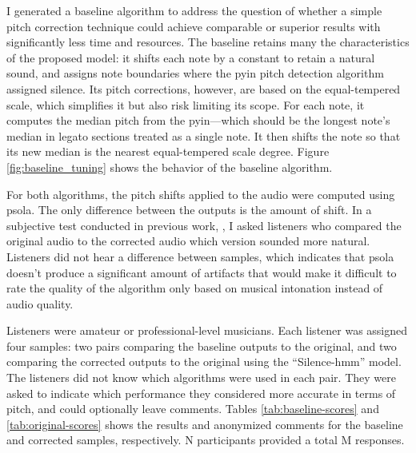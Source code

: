 I generated a baseline algorithm to address the question of whether a simple pitch correction technique could achieve comparable or superior results with significantly less time and resources. The baseline retains many the characteristics of the proposed model: it shifts each note by a constant to retain a natural sound, and assigns note boundaries where the \gls{pyin} pitch detection algorithm assigned silence. Its pitch corrections, however, are based on the equal-tempered scale, which simplifies it but also risk limiting its scope. For each note, it computes the median pitch from the \gls{pyin}---which should be the longest note's median in legato sections treated as a single note. It then shifts the note so that its new median is the nearest equal-tempered scale degree. Figure \ref{fig:baseline_tuning} shows the behavior of the baseline algorithm.

For both algorithms, the pitch shifts applied to the audio were computed using \gls{psola}. The only difference between the outputs is the amount of shift. In a subjective test conducted in previous work, \cite{wager2020deep}, I asked listeners who compared the original audio to the corrected audio which version sounded more natural. Listeners did not hear a difference between samples, which indicates that \gls{psola} doesn't produce a significant amount of artifacts that would make it difficult to rate the quality of the algorithm only based on musical intonation instead of audio quality.

Listeners were amateur or professional-level musicians. Each listener was assigned four samples: two pairs comparing the baseline outputs to the original, and two comparing the corrected outputs to the original using the ``Silence-\gls{hmm}'' model. The listeners did not know which algorithms were used in each pair. They were asked to indicate which performance they considered more accurate in terms of pitch, and could optionally leave comments. Tables \ref{tab:baseline-scores} and \ref{tab:original-scores} shows the results and anonymized comments for the baseline and corrected samples, respectively. N participants provided a total M responses. 


